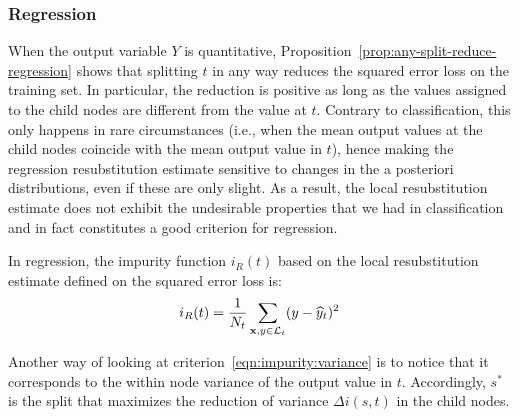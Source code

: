 \subsubsection{Regression}
\label{sec:3:criteria:regression}

When the output variable $Y$ is quantitative, Proposition~\ref{prop:any-split-reduce-regression}
shows that splitting $t$ in any way reduces the
squared error loss on the training set. In particular, the reduction is positive as long as
the values assigned to the child nodes are different from the value at $t$.
Contrary to classification, this only happens in rare circumstances (i.e., when
the mean output values at the child nodes coincide with the mean output value
in $t$), hence making the regression resubstitution estimate sensitive to changes in the a
posteriori distributions, even if these are only slight.  As a result, the
local resubstitution estimate does not exhibit the undesirable properties that
we had in classification and in fact constitutes a good criterion for
regression.

\begin{definition}
In regression, the impurity function $i_R(t)$ based on the local resubstitution estimate
defined on the squared error loss is:
\begin{equation}\label{eqn:impurity:variance}
i_R(t) = \frac{1}{N_t} \sum_{\mathbf{x}, y \in {\cal L}_t} (y - \widehat{y}_t)^2
\end{equation}
\end{definition}

Another way of looking at criterion~\ref{eqn:impurity:variance} is to notice
that it corresponds to the within node variance of the output value in $t$.
Accordingly, $s^*$ is the split that maximizes the reduction of variance
$\Delta i(s, t)$ in the child nodes.

